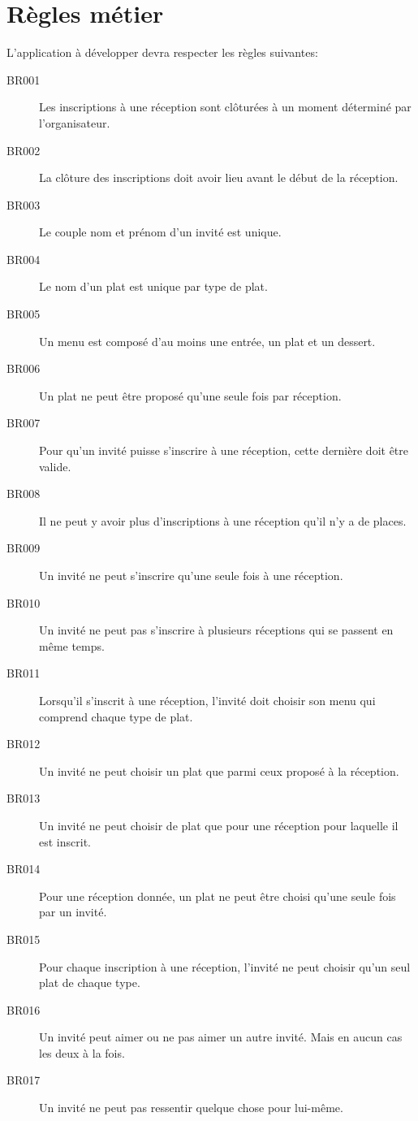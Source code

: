 \chapter{Règles métier}
\label{chapter_business_rules}

L'application à développer devra respecter les règles suivantes:

\begin{description}
  \item[BR001]  Les inscriptions à une réception sont clôturées à un moment déterminé par l'organisateur.
  \item[BR002]  La clôture des inscriptions doit avoir lieu avant le début de la réception.
  \item[BR003]  Le couple nom et prénom d'un invité est unique.
  \item[BR004]  Le nom d'un plat est unique par type de plat.
  \item[BR005]  Un menu est composé d'au moins une entrée, un plat et un dessert.
  \item[BR006]  Un plat ne peut être proposé qu'une seule fois par réception.
  \item[BR007]  Pour qu'un invité puisse s'inscrire à une réception, cette dernière doit être valide.
  \item[BR008]  Il ne peut y avoir plus d'inscriptions à une réception qu'il n'y a de places.
  \item[BR009]  Un invité ne peut s'inscrire qu'une seule fois à une réception.
  \item[BR010]  Un invité ne peut pas s'inscrire à plusieurs réceptions qui se passent en même temps.
  \item[BR011]  Lorsqu'il s'inscrit à une réception, l'invité doit choisir son menu qui comprend chaque type de plat.
  \item[BR012]  Un invité ne peut choisir un plat que parmi ceux proposé à la réception.
  \item[BR013]  Un invité ne peut choisir de plat que pour une réception pour laquelle il est inscrit.
  \item[BR014]  Pour une réception donnée, un plat ne peut être choisi qu'une seule fois par un invité.
  \item[BR015]  Pour chaque inscription à une réception, l'invité ne peut choisir qu'un seul plat de chaque type.
  \item[BR016]  Un invité peut aimer ou ne pas aimer un autre invité. Mais en aucun cas les deux à la fois.
  \item[BR017]  Un invité ne peut pas ressentir quelque chose pour lui-même.

\end{description}
